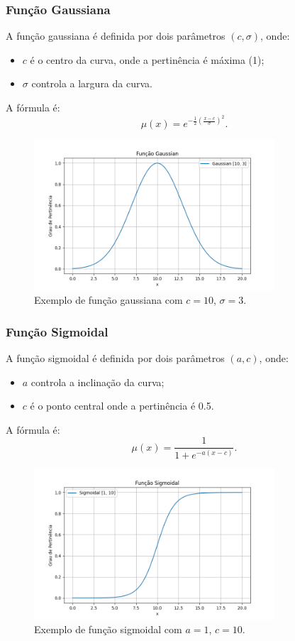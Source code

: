 \documentclass[a4paper,12pt]{article}
\begin{document}
\subsubsection{Função Gaussiana}
A função gaussiana é definida por dois parâmetros $(c, \sigma)$, onde:
\begin{itemize}
    \item $c$ é o centro da curva, onde a pertinência é máxima (1);
    \item $\sigma$ controla a largura da curva.
\end{itemize}
A fórmula é:
\[
\mu(x) = e^{-\frac{1}{2} \left( \frac{x - c}{\sigma} \right)^2}.
\]
\begin{figure}[H]
    \centering
    \includegraphics[width=0.8\textwidth]{img/gaussian.png}
    \caption{Exemplo de função gaussiana com $c=10$, $\sigma=3$.}
    \label{fig:funcao_gaussiana}
\end{figure}

\subsubsection{Função Sigmoidal}
A função sigmoidal é definida por dois parâmetros $(a, c)$, onde:
\begin{itemize}
    \item $a$ controla a inclinação da curva;
    \item $c$ é o ponto central onde a pertinência é 0.5.
\end{itemize}
A fórmula é:
\[
\mu(x) = \frac{1}{1 + e^{-a(x - c)}}.
\]

\begin{figure}[H]
    \centering
    \includegraphics[width=0.8\textwidth]{img/sigmoidal.png}
    \caption{Exemplo de função sigmoidal com $a=1$, $c=10$.}
    \label{fig:funcao_sigmoidal}
\end{figure}
\end{document}

